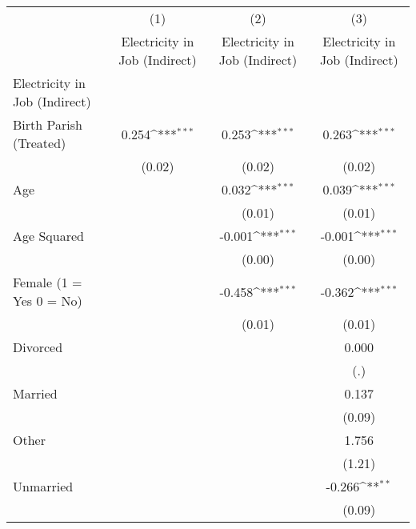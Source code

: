 {
\def\sym#1{\ifmmode^{#1}\else\(^{#1}\)\fi}
\begin{tabular}{l*{3}{c}}
\hline\hline
                    &\multicolumn{1}{c}{(1)}&\multicolumn{1}{c}{(2)}&\multicolumn{1}{c}{(3)}\\
                    &\multicolumn{1}{c}{Electricity in Job (Indirect)}&\multicolumn{1}{c}{Electricity in Job (Indirect)}&\multicolumn{1}{c}{Electricity in Job (Indirect)}\\
\hline
Electricity in Job (Indirect)&                     &                     &                     \\
Birth Parish (Treated)&       0.254\sym{***}&       0.253\sym{***}&       0.263\sym{***}\\
                    &      (0.02)         &      (0.02)         &      (0.02)         \\
Age                 &                     &       0.032\sym{***}&       0.039\sym{***}\\
                    &                     &      (0.01)         &      (0.01)         \\
Age Squared         &                     &      -0.001\sym{***}&      -0.001\sym{***}\\
                    &                     &      (0.00)         &      (0.00)         \\
Female (1 = Yes 0 = No)&                     &      -0.458\sym{***}&      -0.362\sym{***}\\
                    &                     &      (0.01)         &      (0.01)         \\
Divorced            &                     &                     &       0.000         \\
                    &                     &                     &         (.)         \\
Married             &                     &                     &       0.137         \\
                    &                     &                     &      (0.09)         \\
Other               &                     &                     &       1.756         \\
                    &                     &                     &      (1.21)         \\
Unmarried           &                     &                     &      -0.266\sym{**} \\
                    &                     &                     &      (0.09)         \\

\end{tabular}}
